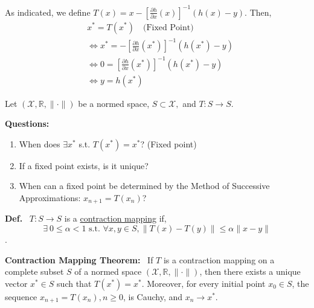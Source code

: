 \documentclass[letterpaper]{article}
\newcommand{\real}{\mathbb R}  %
\begin{document}
As indicated, we define $T\left(x\right) = x-\left[\frac{\partial h}{\partial x}\left(x\right)\right]^{-1}\left(h\left(x\right)-y\right)$.
    Then,\\
 \begin{align*}
 &x^* = T\left(x^*\right) \quad \text{(Fixed Point)}\\
        &\Leftrightarrow x^*=  -\left[\frac{\partial h}{\partial x}\left(x^*\right)\right]^{-1}\left(h\left(x^*\right)-y\right) \\
        &\Leftrightarrow 0=\left[\frac{\partial h}{\partial x}\left(x^*\right)\right]^{-1}\left(h\left(x^*\right)-y\right) \\
        &\Leftrightarrow y = h \left(x^*\right)
    \end{align*}

Let $\left(\mathcal{X},\real,\| \cdot \|\right)$ be a normed space, $S \subset \mathcal{X},$  and $T : S \to S$.

\noindent \textbf{Questions:}
        \vspace{-5mm}
        \begin{enumerate}
            \item When does $\exists x^*$ s.t. $T\left(x^*\right) = x^*$? (Fixed point)
            \item If a fixed point exists, is it unique?
            \item When can a fixed point be determined by the Method of Successive Approximations: $x_{n+1}=T\left(x_n\right)$?
        \end{enumerate}

\noindent \textbf{Def.}~ $T : S \to S$ is a \underline{contraction mapping} if,
$$ \exists ~0 \leq \alpha < 1 \text{ s.t. } \forall x,y \in S, \|T\left(x\right)-T\left(y\right)  \| \leq \alpha \|x-y\|$$.

\noindent \textbf{Contraction Mapping Theorem:}~ If $T$ is a contraction mapping on a complete subset $S$ of a normed space $\left(\mathcal{X},\real,\| \cdot \|\right)$, then there exists a unique vector $x^* \in S$ such that $T\left(x^*\right) = x^*$. Moreover, for every initial point $x_0 \in S$, the sequence $x_{n+1} = T\left(x_n\right), n \geq 0$, is Cauchy, and $x_n \rightarrow x^*$.
\end{document}
